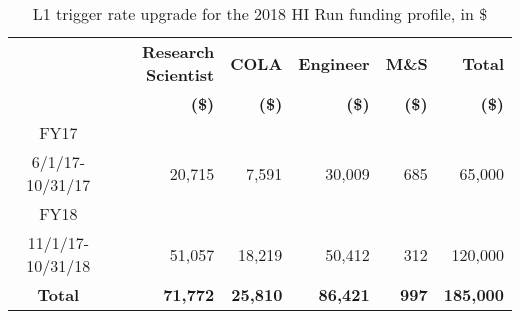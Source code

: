 \begin{table}[hbt]
\begin{center}
\begin{tabular}{|c|r|r|r|r|r|}
\hline
 
                &  \textbf{Research Scientist}  & \textbf{COLA}  & \textbf{Engineer} & \textbf{M\&S}      &  \textbf{Total}\\
                &  \textbf{(\$)}  & \textbf{(\$)}  & \textbf{(\$)} & \textbf{(\$)}      &  \textbf{(\$)}\\ \hline
FY17            &              &        &          &           &         \\
6/1/17-10/31/17  & 20,715      & 7,591  &  30,009  & 685       &  65,000    \\\hline
FY18             &              &        &          &           &         \\
11/1/17-10/31/18  & 51,057    & 18,219   &  50,412     &  312 & 120,000   \\\hline
\textbf{Total}  & \textbf{71,772}    & \textbf{25,810}   &  \textbf{86,421}     &  \textbf{997} & \textbf{185,000} \\\hline
\end{tabular}
\end{center}
\caption{L1 trigger rate upgrade for the 2018 HI Run funding profile, in \$}
\label{OpCost}
\end{table}
